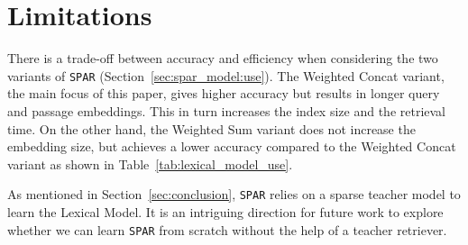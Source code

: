 \documentclass[11pt]{article}
\newcommand{\spar}{\texttt{SPAR}\xspace}
\newcommand{\lexmodel}{Lexical Model}
\newcommand{\lexmodelsymbol}{\xspace}
\begin{document}
\section*{Limitations}

There is a trade-off between accuracy and efficiency when considering the two variants of \spar{} (Section~\ref{sec:spar_model:use}).
The Weighted Concat variant, the main focus of this paper, gives higher accuracy but results in longer query and passage embeddings.
This in turn increases the index size and the retrieval time.
On the other hand, the Weighted Sum variant does not increase the embedding size, but achieves a lower accuracy compared to the Weighted Concat variant as shown in Table~\ref{tab:lexical_model_use}.

As mentioned in Section~\ref{sec:conclusion}, \spar{} relies on a sparse teacher model to learn the \lexmodel \lexmodelsymbol.
It is an intriguing direction for future work to explore whether we can learn \spar{} from scratch without the help of a teacher retriever. 


\end{document}
